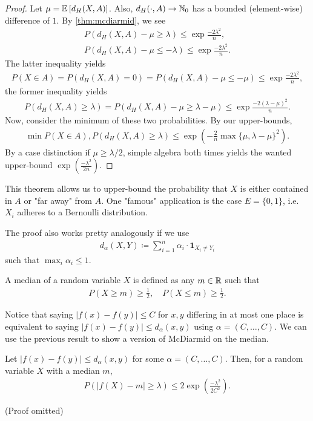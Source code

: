 \begin{proof}
    Let $\mu = \mathbb{E}\left[d_H(X,A)\right]$.
    Also, $d_H(\cdot, A) \rightarrow \mathbb{N}_0$ has a bounded (element-wise) difference of $1$.
    By \autoref{thm:mcdiarmid}, we see
    \begin{align*}
        P(d_H(X,A) - \mu \geq \lambda) \leq \exp{\frac{-2\lambda^2}{n}}, \\
        P(d_H(X,A) - \mu \leq -\lambda) \leq \exp{\frac{-2\lambda^2}{n}}.
    \end{align*}
    The latter inequality yields
    \begin{align*}
        P(X \in A) = P(d_H(X,A) = 0) = P(d_H(X,A) - \mu \leq -\mu) \leq \exp{\frac{-2\lambda^2}{n}},
    \end{align*}
    the former inequality yields
    \begin{align*}
        P(d_H(X,A) \geq \lambda) = P(d_H(X,A) - \mu \geq \lambda -\mu) \leq \exp{\frac{-2(\lambda - \mu)^2}{n}}.
    \end{align*}
    Now, consider the minimum of these two probabilities.
    By our upper-bounds,
    \begin{align*}
        \min P(X \in A), P(d_H(X,A) \geq \lambda) \leq \exp \left(-\frac{2}{n}\max\{\mu, \lambda-\mu\}^2\right).
    \end{align*}
    By a case distinction
    if $\mu \geq \lambda/2$, simple algebra both times yields the wanted upper-bound $\exp(\frac{-\lambda^2}{2n})$.
\end{proof}
This theorem allows us to upper-bound the probability that $X$ is either contained in $A$ or "far away" from $A$.
One "famous" application is the case $E = \{0,1\}$, i.e. $X_i$ adheres to a Bernoulli distribution.
\begin{remark}
    The proof also works pretty analogously if we use
    \begin{align*}
        d_\alpha(X,Y) \coloneqq \sum_{i=1}^{n} \alpha_i \cdot \mathbf{1}_{X_i \neq Y_i}
    \end{align*}
    such that $\max_i \alpha_i \leq 1$.
\end{remark}
\begin{definition}
    A median of a random variable $X$ is defined as any $m \in \mathbb{R}$ such that
    \begin{align*}
        P(X \geq m) \geq \frac{1}{2}, \quad P(X \leq m) \geq \frac{1}{2}.
    \end{align*}
\end{definition}
Notice that saying $|f(x) - f(y)| \leq C$ for $x,y$ differing in at most one place
is equivalent to saying $|f(x) - f(y)| \leq d_\alpha(x,y)$ using $\alpha = (C,\dots,C)$.
We can use the previous result to show a version of McDiarmid on the median.
\begin{theorem}
    Let $|f(x) - f(y)| \leq d_\alpha(x,y)$ for some $\alpha = (C,\dots,C)$.
    Then, for a random variable $X$ with a median $m$,
    \begin{align*}
        P(|f(X) - m| \geq \lambda) \leq 2 \exp \left(\frac{-\lambda^2}{2C^2}\right).
    \end{align*}
\end{theorem}
(Proof omitted)